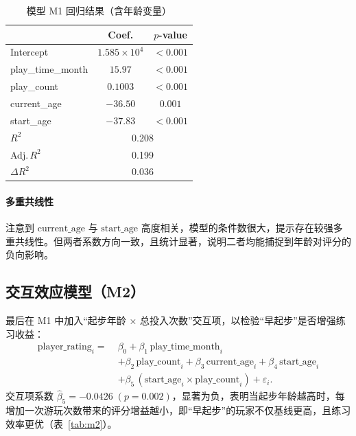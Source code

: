 \documentclass[12pt]{article}
\begin{document}
\begin{table}[htbp]
	\centering
	\caption{模型 M1 回归结果（含年龄变量）}\label{tab:m1}
	\begin{tabular}{lcc}
		\toprule
		& Coef.      & $p$-value  \\\midrule
		Intercept       & $1.585\times10^4$ & $<0.001$ \\
		play\_time\_month & $15.97$     & $<0.001$ \\
		play\_count       & $0.1003$    & $<0.001$ \\
		current\_age      & $-36.50$    & $0.001$  \\
		start\_age        & $-37.83$    & $<0.001$ \\
		\midrule
		$R^2$           & \multicolumn{2}{c}{0.208} \\
		Adj.\,$R^2$     & \multicolumn{2}{c}{0.199} \\
		$\Delta R^2$    & \multicolumn{2}{c}{0.036} \\
		\bottomrule
	\end{tabular}
\end{table}

\paragraph{多重共线性}  
注意到 \(\text{current\_age}\) 与 \(\text{start\_age}\) 高度相关，模型的条件数很大，提示存在较强多重共线性。但两者系数方向一致，且统计显著，说明二者均能捕捉到年龄对评分的负向影响。

\subsection{交互效应模型（M2）}
最后在 M1 中加入“起步年龄 × 总投入次数”交互项，以检验“早起步”是否增强练习收益：
\[
\begin{aligned}
	\text{player\_rating}_i =\;&\beta_0
	+ \beta_1\,\text{play\_time\_month}_i \\
	& + \beta_2\,\text{play\_count}_i
	+ \beta_3\,\text{current\_age}_i
	+ \beta_4\,\text{start\_age}_i \\
	&+ \beta_5\,(\text{start\_age}_i \times \text{play\_count}_i)
	+ \varepsilon_i.
\end{aligned}
\]
交互项系数 \(\hat\beta_5=-0.0426\;(p=0.002)\)，显著为负，表明当起步年龄越高时，每增加一次游玩次数带来的评分增益越小，即“早起步”的玩家不仅基线更高，且练习效率更优（表~\ref{tab:m2}）。
\end{document}
